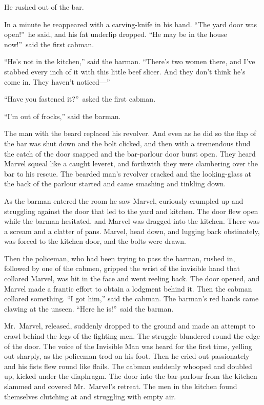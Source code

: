 He rushed out of the bar.

In a minute he reappeared with a carving-knife in his hand. “The yard door was open!”\ he said, and his fat underlip dropped. “He may be in the house now!”\ said the first cabman.

“He’s not in the kitchen,” said the barman. “There’s two women there, and I’ve stabbed every inch of it with this little beef slicer. And they don’t think he’s come in. They haven’t noticed—”

“Have you fastened it?”\ asked the first cabman.

“I’m out of frocks,” said the barman.

The man with the beard replaced his revolver. And even as he did so the flap of the bar was shut down and the bolt clicked, and then with a tremendous thud the catch of the door snapped and the bar-parlour door burst open. They heard Marvel squeal like a caught leveret, and forthwith they were clambering over the bar to his rescue. The bearded man’s revolver cracked and the looking-glass at the back of the parlour started and came smashing and tinkling down.

As the barman entered the room he saw Marvel, curiously crumpled up and struggling against the door that led to the yard and kitchen. The door flew open while the barman hesitated, and Marvel was dragged into the kitchen. There was a scream and a clatter of pans. Marvel, head down, and lugging back obstinately, was forced to the kitchen door, and the bolts were drawn.

Then the policeman, who had been trying to pass the barman, rushed in, followed by one of the cabmen, gripped the wrist of the invisible hand that collared Marvel, was hit in the face and went reeling back. The door opened, and Marvel made a frantic effort to obtain a lodgment behind it. Then the cabman collared something. “I got him,” said the cabman. The barman’s red hands came clawing at the unseen. “Here he is!”\ said the barman.

Mr.\ Marvel, released, suddenly dropped to the ground and made an attempt to crawl behind the legs of the fighting men. The struggle blundered round the edge of the door. The voice of the Invisible Man was heard for the first time, yelling out sharply, as the policeman trod on his foot. Then he cried out passionately and his fists flew round like flails. The cabman suddenly whooped and doubled up, kicked under the diaphragm. The door into the bar-parlour from the kitchen slammed and covered Mr.\ Marvel’s retreat. The men in the kitchen found themselves clutching at and struggling with empty air.

